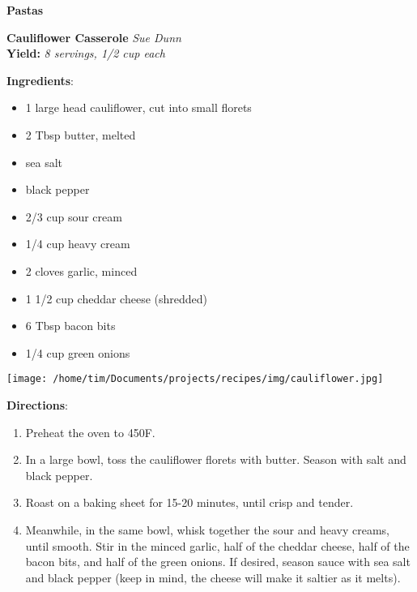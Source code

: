 \documentclass[11pt, twoside, openany]{book}
\begin{document}
{\newpage \LARGE \textbf{Pastas}} \label{pastas}\\
\noindent\begin{minipage}[t]{\linewidth}%
{\Large\textbf{Cauliflower Casserole}} \label{cauliflower-casserole}\hfill\textit{Sue Dunn}\\
\textbf{Yield:} \textit{8 servings, 1/2 cup each}\\
\noindent\begin{minipage}[t]{0.78\linewidth}%
\textbf{Ingredients}:\vspace{-3mm}
\begin{multicols}{2}
\begin{itemize}\setlength\itemsep{-1mm}
\item 1 large head cauliflower, cut into small florets
\item 2 Tbsp butter, melted
\item sea salt
\item black pepper
\item 2/3 cup sour cream
\item 1/4 cup heavy cream
\item 2 cloves garlic, minced
\item 1 1/2 cup cheddar cheese (shredded)
\item 6 Tbsp bacon bits
\item 1/4 cup green onions
\end{itemize}
\end{multicols}
\end{minipage}
\noindent\begin{minipage}[t]{0.18\linewidth}
\centering \strut\vspace*{-\baselineskip}\newline
\texttt{[image: /home/tim/Documents/projects/recipes/img/cauliflower.jpg]}\\
\end{minipage}\vspace{3mm}
\textbf{Directions}:
\vspace{-3mm}\begin{enumerate}\setlength\itemsep{-1mm}
\item Preheat the oven to 450F.
\item In a large bowl, toss the cauliflower florets with butter. Season with salt and black pepper.
\item Roast on a baking sheet for 15-20 minutes, until crisp and tender.
\item Meanwhile, in the same bowl, whisk together the sour and heavy creams, until smooth. Stir in the minced garlic, half of the cheddar cheese, half of the bacon bits, and half of the green onions. If desired, season sauce with sea salt and black pepper (keep in mind, the cheese will make it saltier as it melts).

\end{enumerate}
\end{minipage}
\end{document}
